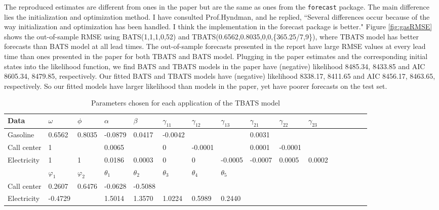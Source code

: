 \documentclass{uwstat572}
\begin{document}
The reproduced estimates are different from ones in the paper but are the same as ones from the \texttt{forecast} package. The main difference lies the initialization and optimization method. I have consulted Prof.Hyndman, and he replied, ``Several differences occur because of the way initialization and optimization has been handled. I think the implementation in the forecast package is better." Figure \ref{fig:gasRMSE} shows the out-of-sample RMSE using BATS(1,1,1,0,52) and TBATS(0.6562,0.8035,0,0,\{365.25/7,9\}), where TBATS model has better forecasts than BATS model at all lead times. The out-of-sample forecasts presented in the report have large RMSE values at every lead time than ones presented in the paper for both TBATS and BATS model. Plugging in the paper estimates and the corresponding initial states into the likelihood function, we find BATS and TBATS models in the paper have (negative) likelihood 8485.34, 8433.85 and AIC 8605.34, 8479.85, respectively. Our fitted BATS and TBATS models have (negative) likelihood 8338.17, 8411.65 and AIC 8456.17, 8463.65, respectively. So our fitted models have larger likelihood than models in the paper, yet have poorer forecasts on the test set. 

\begin{table}[]
\small
\centering
\caption{Parameters chosen for each application of the TBATS model}
\label{table:TBATS}
\begin{tabular}{l l l l l l l l l l l l l l l l}
\hline \hline
Data &$\omega$ & $\phi$ & $\alpha$  & $\beta$ & $\gamma_{11}$ & $\gamma_{12}$ & $\gamma_{13}$ & $\gamma_{21}$ & $\gamma_{22}$ & $\gamma_{23}$  \\
\hline
Gasoline &0.6562 & 0.8035 & -0.0879& 0.0417 & -0.0042 &          &   &  0.0031    &           &               \\ 
Call center &1 &   & 0.0065 &         & 0 & -0.0001 & &   0.0001     &  -0.0001 &                   \\
Electricity & 1 & 1 & 0.0186 & 0.0003       & 0  & 0 & -0.0005 &  -0.0007  & 0.0005 & 0.0002 \\ \hline
 & $\varphi_1$ & $\varphi_2$  & $\theta_1$ & $\theta_2$ &  $\theta_3$ &$\theta_4$ &  $\theta_5$\\
 Call center  &0.2607  &  0.6476  & -0.0628   & -0.5088    \\
Electricity & -0.4729 & & 1.5014 &   1.3570   & 1.0224  &  0.5989 &   0.2440     \\ \hline \hline
\end{tabular}
\end{table}
\end{document}
